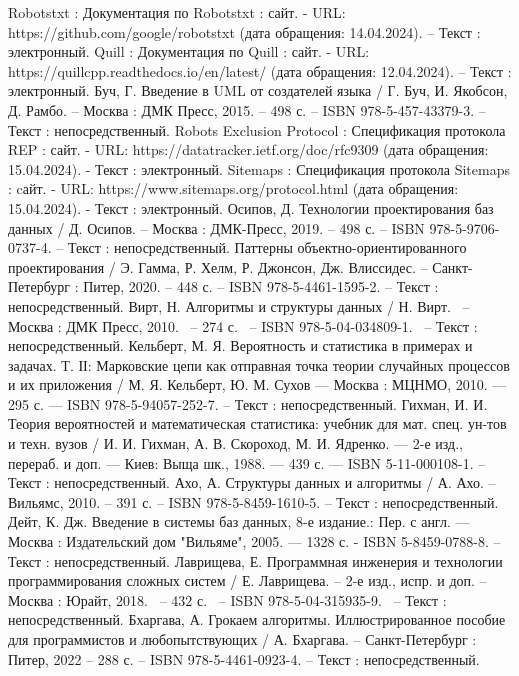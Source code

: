 \begin{thebibliography}{51}
	 Robotstxt : Документация по Robotstxt : сайт. - URL: https://github.com/google/robotstxt (дата обращения: 14.04.2024). – Текст : электронный.
	 Quill : Документация по Quill : сайт. - URL: https://quillcpp.readthedocs.io/en/latest/ (дата обращения: 12.04.2024). – Текст : электронный.
	  Буч, Г. Введение в UML от создателей языка / Г. Буч, И. Якобсон, Д. Рамбо. – Москва : ДМК Пресс, 2015. – 498 с. – ISBN 978-5-457-43379-3. – Текст : непосредственный.
	 Robots Exclusion Protocol : Спецификация протокола REP : сайт. - URL: https://datatracker.ietf.org/doc/rfc9309 (дата обращения: 15.04.2024). - Текст : электронный.
	 Sitemaps : Спецификация протокола Sitemaps : cайт. - URL: https://www.sitemaps.org/protocol.html (дата обращения: 15.04.2024). - Текст : электронный.
	 Осипов, Д. Технологии проектирования баз данных / Д. Осипов. – Москва : ДМК-Пресс, 2019. – 498 с. – ISBN 978-5-9706-0737-4. – Текст : непосредственный.
	 Паттерны объектно-ориентированного проектирования / Э. Гамма, Р. Хелм, Р. Джонсон, Дж. Влиссидес. – Санкт-Петербург : Питер, 2020. – 448 с. – ISBN 978-5-4461-1595-2. – Текст : непосредственный.
	 Вирт, Н. Алгоритмы и структуры данных / Н. Вирт. ~– Москва : ДМК Пресс, 2010. ~– 274 с. ~– ISBN 978-5-04-034809-1. ~– Текст : непосредственный.
	 Кельберт, М. Я. Вероятность и статистика в примерах и задачах. Т. ІІ: Марковские цепи как отправная точка теории случайных процессов и их приложения / М. Я. Кельберт, Ю. М. Сухов  — Москва : МЦНМО, 2010. — 295 с. — ISBN 978-5-94057-252-7. – Текст : непосредственный.
	 Гихман, И. И. Теория вероятностей и математическая статистика: учебник для мат. спец. ун-тов и техн. вузов / И. И. Гихман, А. В. Скороход, М. И. Ядренко. — 2-е изд., перераб. и доп. — Киев: Выща шк., 1988. — 439 с. — ISBN 5-11-000108-1. – Текст : непосредственный.
	 Ахо, А. Структуры данных и алгоритмы / А. Ахо. – Вильямс, 2010. – 391 с. – ISBN 978-5-8459-1610-5. – Текст : непосредственный.
	 Дейт, К. Дж. Введение в системы баз данных, 8-е издание.: Пер. с англ. — Москва : Издательский дом "Вильяме", 2005. — 1328 с. - ISBN 5-8459-0788-8. – Текст : непосредственный.
	 Лаврищева, Е. Программная инженерия и технологии программирования сложных систем / Е. Лаврищева. – 2-е изд., испр. и доп. – Москва : Юрайт, 2018. ~– 432 с. ~– ISBN 978-5-04-315935-9. ~– Текст : непосредственный.
	 Бхаргава, А. Грокаем алгоритмы. Иллюстрированное пособие для программистов и любопытствующих / А. Бхаргава. – Санкт-Петербург : Питер, 2022 – 288 с. – ISBN 978-5-4461-0923-4. – Текст : непосредственный.

\end{thebibliography}
